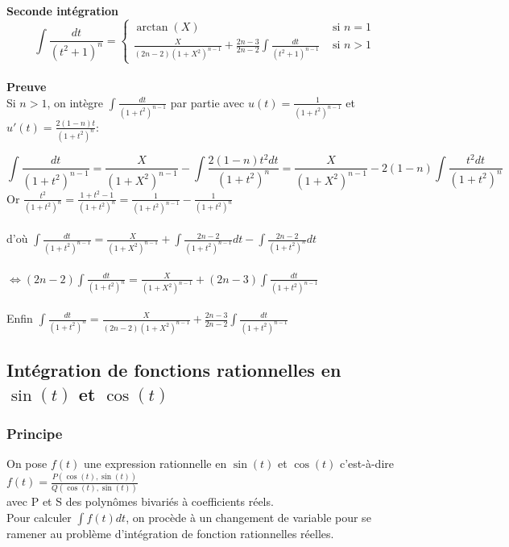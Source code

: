 \documentclass[a4paper,10pt]{book} %
\begin{document}
\textbf{Seconde intégration}
$$\int\frac{dt}{(t^2+1)^n}=\left\{\begin{array}{ccl}
\arctan(X)&\text{ si }n=1& \\
\displaystyle\frac{X}{(2n-2)(1+X^2)^{n-1}}+\frac{2n-3}{2n-2}\int\frac{dt}{(t^2+1)^{n-1}}&\text{ si }n>1&
\end{array}\right.$$\\

\textbf{\phantom{aaaa}Preuve}\\
Si $n>1$, on intègre $\displaystyle\int\frac{dt}{(1+t^2)^{n-1}}$ par partie avec $\displaystyle u(t)=\frac{1}{(1+t^2)^{n-1}}$ et $\displaystyle u'(t)=\frac{2(1-n)t}{(1+t^2)^n}$:

$$\displaystyle\int\frac{dt}{(1+t^2)^{n-1}} =\frac{X}{(1+X^2)^{n-1}}-\int\frac{2(1-n)t^2dt}{(1+t^2)^n} =\frac{X}{(1+X^2)^{n-1}}- 2(1-n) \int\frac{t^2dt}{(1+t^2)^n}$$
Or $\displaystyle\frac{t^2}{(1+t^2)^n} =\frac{1+t^2-1}{(1+t^2)^n} =\frac{1}{(1+t^2)^{n-1}}-\frac{1}{(1+t^2)^n}$\\\\

d'où $\displaystyle\int\frac{dt}{(1+t^2)^{n-1}} =\frac{X}{(1+X^2)^{n-1}}+\int\frac{2n-2}{(1+t^2)^{n-1}}dt -\int\frac{2n-2}{(1+t^2)^n}dt$\\\\

$\Leftrightarrow\displaystyle(2n-2)\int\frac{dt}{(1+t^2)^n} =\frac{X}{(1+X^2)^{n-1}}+ (2n-3)\int\frac{dt}{(1+t^2)^{n-1}}$\\\\

Enfin $\displaystyle\int\frac{dt}{(1+t^2)^n} =\frac{X}{(2n-2)(1+X^2)^{n-1}}+ \frac{2n-3}{2n-2}\int\frac{dt}{(1+t^2)^{n-1}}$

\subsection{Intégration de fonctions rationnelles en $\sin(t)$ et $\cos(t)$}
\subsubsection{Principe}
On pose $f(t)$ une expression rationnelle en $\sin(t)$ et $\cos(t)$ c'est-à-dire $f(t)=\frac{P(\cos(t),\sin(t))}{Q(\cos(t),\sin(t))}$\\
avec P et S des polynômes bivariés à coefficients réels.\\

Pour calculer $\displaystyle\int f(t)dt$, on procède à un changement de variable pour se ramener au problème d'intégration de fonction rationnelles réelles.\\
\end{document}
